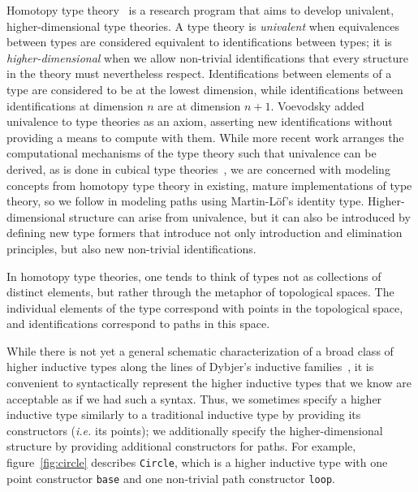 \documentclass[sigplan,10pt]{acmart}
\begin{document}
Homotopy type theory~\cite{HoTT-2013} is a research program that aims to develop univalent, higher-dimensional type theories.
A type theory is \emph{univalent} when equivalences between types are considered equivalent to identifications between types; it is \emph{higher-dimensional} when we allow non-trivial identifications that every structure in the theory must nevertheless respect.
Identifications between elements of a type are considered to be at the lowest dimension, while identifications between identifications at dimension $n$ are at dimension $n+1$.
Voevodsky added univalence  to type theories as an axiom, asserting new identifications without providing a means to compute with them.
While more recent work arranges the computational mechanisms of the type theory such that univalence can be derived, as is done in cubical type theories~\citep{cohen, Angiuli-2017}, we are concerned with modeling concepts from homotopy type theory in existing, mature implementations of type theory, so we follow \citet{HoTT-2013} in modeling paths using Martin-Löf's identity type.
Higher-dimensional structure can arise from univalence, but it can also be introduced by defining new type formers that introduce not only introduction and elimination principles, but also new non-trivial identifications.

In homotopy type theories, one tends to think of types not as collections of distinct elements, but rather through the metaphor of topological spaces.
The individual elements of the type correspond with points in the topological space, and identifications correspond to paths in this space.



While there is not yet a general schematic characterization of a broad class of higher inductive types along the lines of Dybjer's inductive families~\citep{Dybjer1994}, it is convenient to syntactically represent the higher inductive types that we know are acceptable as if we had such a syntax.
Thus, we sometimes specify a higher inductive type similarly to a traditional inductive type by providing its constructors (\textit{i.e.} its points); we additionally specify the higher-dimensional structure by providing additional constructors for paths. For example, figure~\ref{fig:circle} describes \Verb|Circle|, which is a higher inductive type with one point constructor \Verb|base| and one non-trivial path constructor \Verb|loop|.
\end{document}
